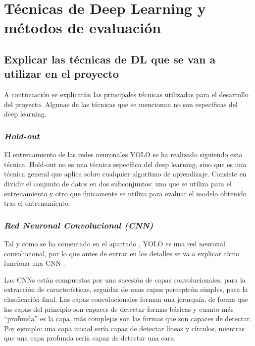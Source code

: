 \section{Técnicas de Deep Learning y métodos de evaluación}
\label{sec:tecnicas_de_deep_learning_y_metodos_de_evaluacion}

\subsection{Explicar las técnicas de DL que se van a utilizar en el proyecto}

A continuación se explicarán las principales técnicas utilizadas para el desarrollo del proyecto. Algunas de las técnicas que se mencionan no son específicas del deep learning.

\subsubsection*{\textit{Hold-out}}

El entrenamiento de las redes neuronales YOLO se ha realizado siguiendo esta técnica. Hold-out no es una técnica específica del deep learning, sino que es una técnica general que aplica sobre cualquier algoritmo de aprendizaje. Consiste en dividir el conjunto de datos en dos subconjuntos: uno que se utiliza para el entrenamiento y otro que únicamente se utiliza para evaluar el modelo obtenido tras el entrenamiento.

\subsubsection*{\textit{Red Neuronal Convolucional (CNN)}}

Tal y como se ha comentado en el apartado \textit{}, YOLO es una red neuronal convolucional, por lo que antes de entrar en los detalles se va a explicar cómo funciona una CNN \cite{s5_cnn1} \cite{s5_cnn2} \cite{s5_cnn3}.

Las CNNs están compuestas por una sucesión de capas convolucionales, para la extracción de características, seguidas de unas capas perceptrón simples, para la clasificación final. Las capas convolucionales forman una jerarquía, de forma que las capas del principio son capaces de detectar formas básicas y cuanto más ``profunda'' es la capa, más complejas son las formas que son capaces de detectar. Por ejemplo: una capa inicial sería capaz de detectar líneas y círculos, mientras que una capa profunda sería capaz de detectar una cara.


